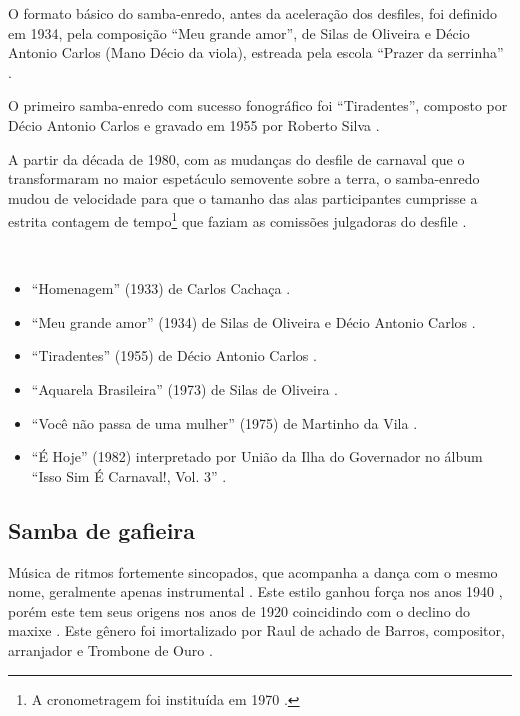 O formato básico do samba-enredo, antes da aceleração dos desfiles, foi definido em 1934, 
pela composição ``Meu grande amor'', 
de Silas de Oliveira e Décio Antonio Carlos (Mano Décio da viola), 
estreada pela escola ``Prazer da serrinha'' \cite[pp. 85-86]{de2003tem}.

O primeiro samba-enredo com sucesso fonográfico foi ``Tiradentes'', 
 composto por Décio Antonio Carlos e gravado em 1955 por Roberto Silva  \cite[pp. 86]{de2003tem}. 

A partir da década de 1980, 
com as mudanças do desfile de carnaval que o transformaram no maior espetáculo semovente sobre a terra, 
o samba-enredo mudou de velocidade para que o tamanho das alas participantes cumprisse 
a estrita contagem de tempo\footnote{A cronometragem foi instituída em 1970  \cite{rizzi2016musica}.} 
que faziam as comissões julgadoras do desfile \cite[pp. 88]{de2003tem} \cite{rizzi2016musica}.
\begin{example} ~

\begin{itemize}
\item ``Homenagem'' (1933) de Carlos Cachaça \cite{rizzi2016musica}.
\item ``Meu grande amor'' (1934) de Silas de Oliveira e Décio Antonio Carlos \cite[pp. 84-85]{de2003tem}.
\item ``Tiradentes'' (1955) de Décio Antonio Carlos  \cite[pp. 86]{de2003tem}.
\item ``Aquarela Brasileira'' (1973) de Silas de Oliveira \cite[pp. 123]{de2003tem} \cite[pp. 253]{diniz2006almanaque}.
\item ``Você não passa de uma mulher'' (1975) de Martinho da Vila \cite{martinhodavila} \cite[pp. 185]{diniz2006almanaque}.
\item ``É Hoje'' (1982) interpretado por União da Ilha do Governador no álbum ``Isso Sim É Carnaval!, Vol. 3'' \cite{subgenerosdosamba1}.
\end{itemize}
\end{example}


\subsection{Samba de gafieira}
Música de ritmos fortemente sincopados, que acompanha a dança com o mesmo nome, geralmente apenas instrumental \cite[pp. 291]{dourado2004dicionario} \cite[pp. 685]{marcondes1977enciclopediav2}.
Este estilo ganhou força nos anos 1940 \cite[pp. 142]{perna2002samba} \cite[pp. 291]{dourado2004dicionario} \cite[pp. 685]{marcondes1977enciclopediav2},
porém este tem seus origens nos anos de 1920 coincidindo com o declino do maxixe \cite[pp. 63]{reinato2010musica}.
Este gênero foi imortalizado por Raul de achado de Barros, 
compositor, arranjador e Trombone de Ouro \cite[pp. 63]{reinato2010musica}.

